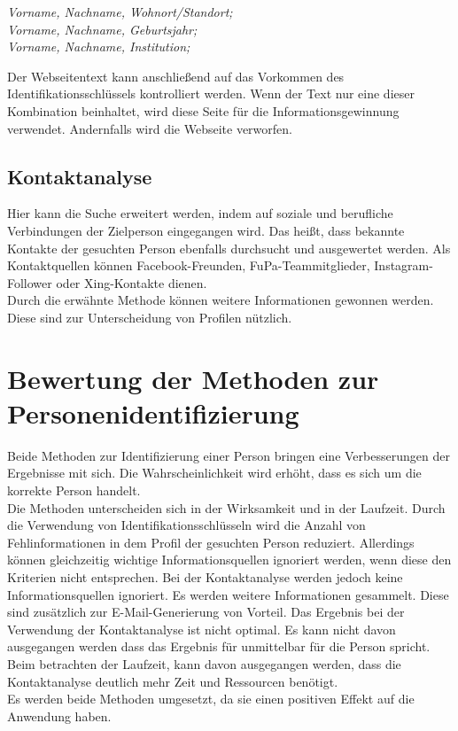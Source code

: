	\textit{Vorname, Nachname, Wohnort/Standort;}\\
	\textit{Vorname, Nachname, Geburtsjahr;}\\
	\textit{Vorname, Nachname, Institution;}
	
	Der Webseitentext kann anschließend auf das Vorkommen des Identifikationsschlüssels kontrolliert werden. Wenn der Text nur eine dieser Kombination beinhaltet, wird diese Seite für die Informationsgewinnung verwendet. Andernfalls wird die Webseite verworfen.\\
	
	\subsection{Kontaktanalyse}	
	Hier kann die Suche erweitert werden, indem auf soziale und berufliche Verbindungen der Zielperson eingegangen wird. Das heißt, dass bekannte Kontakte der gesuchten Person ebenfalls durchsucht und ausgewertet werden. Als Kontaktquellen können Facebook-Freunden, FuPa-Teammitglieder, Instagram-Follower oder Xing-Kontakte dienen.\\
	Durch die erwähnte Methode können weitere Informationen gewonnen werden. Diese sind zur Unterscheidung von Profilen nützlich.
		
\section{Bewertung der Methoden zur Personenidentifizierung}
Beide Methoden zur Identifizierung einer Person bringen eine Verbesserungen der Ergebnisse mit sich. Die Wahrscheinlichkeit wird erhöht, dass es sich um die korrekte Person handelt. \\
Die Methoden unterscheiden sich in der Wirksamkeit und in der Laufzeit. Durch die Verwendung von Identifikationsschlüsseln wird die Anzahl von Fehlinformationen in dem Profil der gesuchten Person reduziert. Allerdings können gleichzeitig wichtige Informationsquellen ignoriert werden, wenn diese den Kriterien nicht entsprechen. Bei der Kontaktanalyse werden jedoch keine Informationsquellen ignoriert. Es werden weitere Informationen gesammelt. Diese sind zusätzlich zur E-Mail-Generierung von Vorteil. Das Ergebnis bei der Verwendung der Kontaktanalyse ist nicht optimal. Es kann nicht davon ausgegangen werden dass das Ergebnis für unmittelbar für die Person spricht. Beim betrachten der Laufzeit, kann davon ausgegangen werden, dass die Kontaktanalyse deutlich mehr Zeit und Ressourcen benötigt.\\
Es werden beide Methoden umgesetzt, da sie einen positiven Effekt auf die Anwendung haben.

